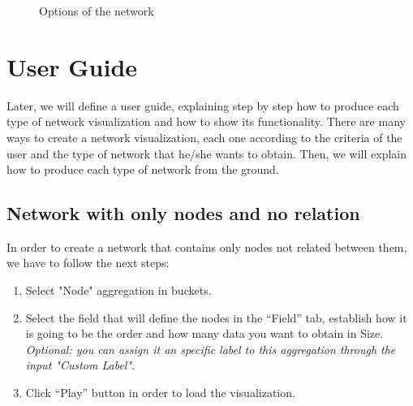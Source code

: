 \documentclass[a4paper, 12pt]{book}
\begin{document}
\begin{figure}[H]
 \centering
 \caption{Options of the network}
 \label{f:optionsnetwork}
\end{figure}

\section{User Guide}

Later, we will define a user guide, explaining step by step how to produce each type of network visualization and how to show its functionality. There are many ways to create a network visualization, each one according to the criteria of the user and the type of network that he/she wants to obtain. Then, we will explain how to produce each type of network from the ground.

\subsection{Network with only nodes and no relation}

In order to create a network that contains only nodes not related between them, we have to follow the next steps:

\begin{enumerate}
\item Select "Node" aggregation in buckets.
\item Select the field that will define the nodes in the “Field” tab, establish how it is going to be the order and how many data you want to obtain in Size. \textit{Optional: you can assign it an specific label to this aggregation through the input "Custom Label".}
\item Click “Play” button in order to load the visualization.
\end{enumerate}
\end{document}
